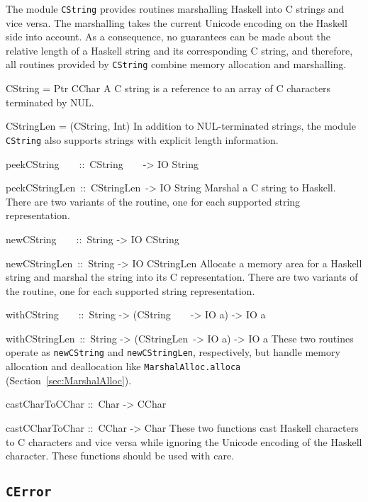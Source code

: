 \documentclass[a4paper,twosides]{article}
\makeatletter
\newcommand{\code}[1]{\texttt{#1}}      %
\newenvironment{codedesc}{%
  \list{}{\labelwidth\z@
    \let\makelabel\codedesclabel}
  }{%
  \endlist
  }
\newcommand*{\codedesclabel}[1]{%
  \hspace{-\leftmargin}
  \parbox[b]{\labelwidth}{\makebox[0pt][l]{\code{#1}}\\}\hfil\relax
  }
\newcommand{\combineitems}{\vspace*{-\itemsep}\vspace*{-\parsep}\vspace*{-1em}}
\makeatother
\begin{document}
The module \code{CString} provides routines marshalling Haskell into C strings
and vice versa.  The marshalling takes the current Unicode encoding on the
Haskell side into account.  As a consequence, no guarantees can be made about
the relative length of a Haskell string and its corresponding C string, and
therefore, all routines provided by \code{CString} combine memory allocation
and marshalling.
%
\begin{codedesc}
\item[CString = Ptr CChar] A C string is a reference to an array of C
  characters terminated by NUL.

\item[CStringLen = (CString, Int)] In addition to NUL-terminated strings,
  the module \code{CString} also supports strings with explicit length
  information. 

\item[peekCString~~~~::\ CString~~~~-> IO String]
\item[peekCStringLen~::\ CStringLen~-> IO String]\combineitems
  Marshal a C string to Haskell.  There are two variants of the routine, one
  for each supported string representation.

\item[newCString~~~~::\ String -> IO CString]
\item[newCStringLen~::\ String -> IO CStringLen] \combineitems Allocate a
  memory area for a Haskell string and marshal the string into its C
  representation.  There are two variants of the routine, one for each
  supported string representation.

\item[withCString~~~~::\ String -> (CString~~~~-> IO a) -> IO a]
\item[withCStringLen~::\ String -> (CStringLen~-> IO a) -> IO a] \combineitems
  These two routines operate as \code{newCString} and \code{newCStringLen},
  respectively, but handle memory allocation and deallocation like
  \code{MarshalAlloc.alloca} (Section~\ref{sec:MarshalAlloc}).

\item[castCharToCChar ::\ Char -> CChar]
\item[castCCharToChar ::\ CChar -> Char] \combineitems These two functions cast
  Haskell characters to C characters and vice versa while ignoring the Unicode
  encoding of the Haskell character.  These functions should be used with
  care.
\end{codedesc}

\subsection{\code{CError}}
\label{sec:CError}
\end{document}
